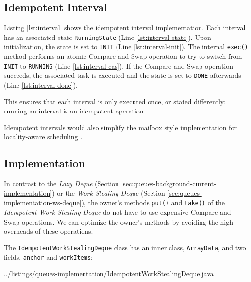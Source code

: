 \subsection{Idempotent Interval}
\label{sec:queues-implementation-idempotent-ws-deque-interval}

Listing \ref{lst:interval} shows the idempotent interval
implementation. Each interval has an associated state
\lstinline!RunningState! (Line \ref{lst:interval-state}). Upon
initialization, the state is set to \lstinline!INIT! (Line
\ref{lst:interval-init}). The internal \lstinline!exec()!  method
performs an atomic Compare-and-Swap operation to try to switch from
\lstinline!INIT! to \lstinline!RUNNING! (Line
\ref{lst:interval-cas}). If the Compare-and-Swap operation succeeds,
the associated task is executed and the state is set to
\lstinline!DONE! afterwards (Line \ref{lst:interval-done}).



This ensures that each interval is only executed once, or stated
differently: running an interval is an idempotent operation.

Idempotent intervals would also simplify the mailbox style
implementation for locality-aware scheduling \cite{Acar2002}.

\subsection{Implementation}
\label{sec:queues-implementation-idempotent-ws-deque-implementation}

In contrast to the \emph{Lazy Deque} (Section
\ref{sec:queues-background-current-implementation}) or the
\emph{Work-Stealing Deque} (Section
\ref{sec:queues-implementation-ws-deque}), the owner's methods
\lstinline!put()! and \lstinline!take()! of the \emph{Idempotent
Work-Stealing Deque} do not have to use expensive Compare-and-Swap
operations. We can optimize the owner's methods by avoiding the high
overheads of these operations.

The \lstinline!IdempotentWorkStealingDeque! class has an inner class,
\lstinline!ArrayData!, and two fields, \lstinline!anchor! and
\lstinline!workItems!:


{
    ../listings/queues-implementation/IdempotentWorkStealingDeque.java
}

